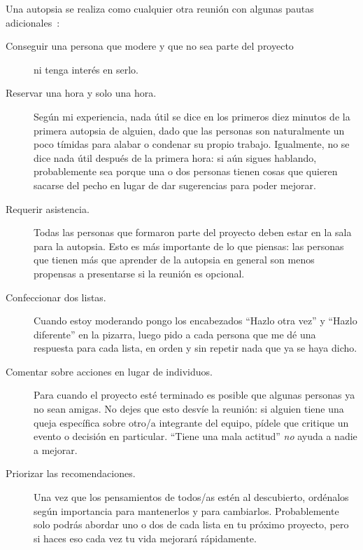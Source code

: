 Una autopsia se realiza como cualquier otra reunión
con algunas pautas adicionales~\cite{Derb2006}:

\begin{description}

\item[Conseguir una persona que modere y que no sea parte del proyecto]
  ni tenga interés en serlo.

\item[Reservar una hora y solo una hora.]
  Según mi experiencia,
  nada útil se dice en los primeros diez minutos de la primera autopsia de alguien,
  dado que las personas son naturalmente un poco tímidas para alabar o condenar su propio trabajo.
  Igualmente,
  no se dice nada útil después de la primera hora:
  si aún sigues hablando,
  probablemente sea porque una o dos personas
  tienen cosas que quieren sacarse del pecho
  en lugar de dar sugerencias para poder mejorar.

\item[Requerir asistencia.]
  Todas las personas que formaron parte del proyecto deben estar en la sala para la autopsia.
  Esto es más importante de lo que piensas:
  las personas que tienen más que aprender de la autopsia
  en general son menos propensas a presentarse si la reunión es opcional.

\item[Confeccionar dos listas.]
  Cuando estoy moderando
  pongo los encabezados ``Hazlo otra vez'' y ``Hazlo diferente'' en la pizarra,
  luego pido a cada persona que me dé una respuesta para cada lista, en orden y 
  sin repetir nada que ya se haya dicho.

\item[Comentar sobre acciones en lugar de individuos.]
  Para cuando el proyecto esté terminado
  es posible que algunas personas ya no sean amigas.
  No dejes que esto desvíe la reunión:
  si alguien tiene una queja específica sobre otro/a integrante del equipo,
  pídele que critique un evento o decisión en particular.
  ``Tiene una mala actitud'' \emph{no} ayuda a nadie a mejorar.

\item[Priorizar las recomendaciones.]
  Una vez que los pensamientos de todos/as estén al descubierto,
  ordénalos según importancia para mantenerlos
  y para cambiarlos.
  Probablemente solo podrás abordar uno o dos de cada lista en tu próximo proyecto,
  pero si haces eso cada vez
  tu vida mejorará rápidamente.

\end{description}
